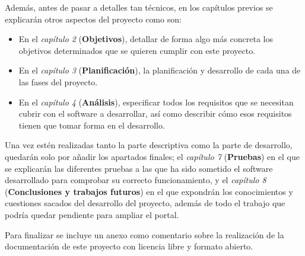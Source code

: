 \bigskip
Además, antes de pasar a detalles tan técnicos, en los capítulos previos se explicarán otros aspectos del proyecto como son:

\begin{itemize}
  \item En el \textit{capítulo 2} (\textbf{Objetivos}), detallar de forma algo más concreta los objetivos determinados que se quieren cumplir con este proyecto.
  \item En el \textit{capítulo 3} (\textbf{Planificación}), la planificación y desarrollo de cada una de las fases del proyecto.
  \item En el \textit{capítulo 4} (\textbf{Análisis}), especificar todos los requisitos que se necesitan cubrir con el software a desarrollar, así como describir cómo esos requisitos tienen que tomar forma en el desarrollo.
\end{itemize}

\bigskip
Una vez estén realizadas tanto la parte descriptiva como la parte de desarrollo, quedarán solo por añadir los apartados finales; el \textit{capítulo 7} (\textbf{Pruebas}) en el que se explicarán las diferentes pruebas a las que ha sido sometido el software desarrollado para comprobar su correcto funcionamiento, y el \textit{capítulo 8} (\textbf{Conclusiones y trabajos futuros}) en el que expondrán los conocimientos y cuestiones sacados del desarrollo del proyecto, además de todo el trabajo que podría quedar pendiente para ampliar el portal.

\bigskip
Para finalizar se incluye un anexo como comentario sobre la realización de la documentación de este proyecto con licencia libre y formato abierto.